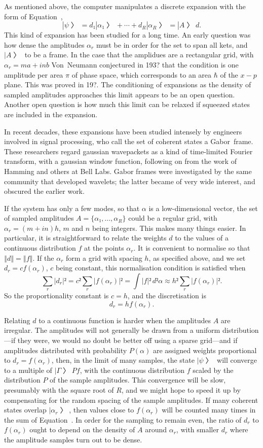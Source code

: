 
As mentioned above, the computer manipulates a discrete expansion with the form of Equation~\Ad,
$$|ψ〉=d₁|α₁〉+⋯+d_R|α_R〉=|A〉d.$$
This kind of expansion has been studied for a long time.  An early question was how dense the amplitudes $α_r$ must be in order for the set to span all kets, and $|A〉$ to be a frame.  In the case that the amplidues are a rectangular grid, with $α_r=ma+inb$ Von~Neumann conjectured in 193? that the condition is one amplitude per area $π$ of phase space, which corresponds to an area $\hbar$ of the $x-p$ plane.  This was proved in 19?.  The conditioning of expansions as the density of sampled amplitudes approaches this limit appears to be an open question.  Another open question is how much this limit can be relaxed if squeezed states are included in the expansion.

In recent decades, these expansions have been studied intensely by engineers involved in signal processing, who call the set of coherent states a Gabor~frame.  These researchers regard gaussian wavepackets as a kind of time-limited Fourier transform, with a gaussian window function, following on from the work of Hamming and others at Bell Labs.  Gabor frames were investigated by the same community that developed wavelets; the latter became of very wide interest, and obscured the earlier work.

If the system has only a few modes, so that $α$ is a low-dimensional vector, the set of sampled amplitudes $A=\{α₁, …,α_R\}$ could be a regular grid, with $α_r=(m+in)h$, $m$ and $n$ being integers.  This makes many things easier.  In particular, it is straightforward to relate the weights $d$ to the values of a continuous distribution $f$ at the points $α_r$.  It is convenient to normalise so that $‖d‖=‖f‖$.  If the $α_r$ form a grid with spacing $h$, as specified above, and we set $d_r=cf(α_r)$, $c$ being constant, this normalisation condition is satisfied when
$$∑_r|d_r|²=c²∑_r|f(α_r)|²=\int |f|²\,d²α≈h²∑_r|f(α_r)|².$$
So the proportionality constant is $c=h$, and the discretisation is
$$d_r=hf(α_r).$$

Relating $d$ to a continuous function is harder when the amplitudes $A$ are irregular.  The amplitudes will not generally be drawn from a uniform distribution—if they were, we would no doubt be better off using a sparse grid—and if amplitudes distributed with probability $P(α)$ are assigned weights proportional to $d_r=f(α_r)$, then, in the limit of many samples, the state $|ψ〉$ will converge to a multiple of $|Γ〉Pf$, with the continuous distribution $f$ scaled by the distribution $P$ of the sample amplitudes.   This convergence will be slow, presumably with the square root of $R$, and we might hope to speed it up by compensating for the random spacing of the sample amplitudes.  If many coherent states overlap $|α_r〉$, then values close to $f(α_r)$ will be counted many times in the sum of Equation~\Ad.  In order for the sampling to remain even, the ratio of $d_r$ to $f(α_r)$ ought to depend on the density of $A$ around $α_r$, with smaller $d_r$ where the amplitude samples turn out to be dense.

